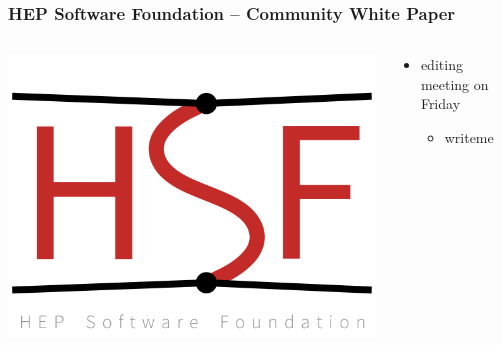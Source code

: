 \maketitle

\begin{frame}
  \frametitle{HEP Software Foundation -- Community White Paper}
  \begin{columns}
    \begin{column}{.3\textwidth}
      \includegraphics[width=\textwidth]{./hsf_logo_angled.png}
    \end{column}
    \begin{column}{.7\textwidth}
      \begin{itemize}
        \item editing meeting on Friday
          \begin{itemize}
            \item writeme
          \end{itemize}
      \end{itemize}
    \end{column}
  \end{columns}
\end{frame}

